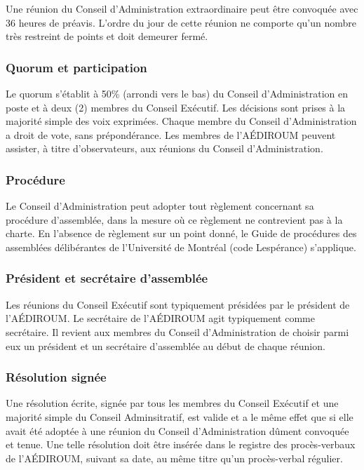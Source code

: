 \documentclass{aediroum}
\begin{document}
Une réunion du Conseil d'Administration extraordinaire peut être convoquée avec 36 heures de préavis. L'ordre du jour de cette réunion ne comporte qu'un nombre très restreint de points et doit demeurer fermé.

\subsubsection{Quorum et participation}\label{sec:quorum-et-participation}

Le quorum s'établit à 50\% (arrondi vers le bas) du Conseil d'Administration en poste et à deux (2) membres du Conseil Exécutif. Les décisions sont prises à la majorité simple des voix exprimées. Chaque membre du Conseil d'Administration a droit de vote, sans prépondérance. Les membres de l'AÉDIROUM peuvent assister, à titre d'observateurs, aux réunions du Conseil d'Administration.

\subsubsection{Procédure}\label{sec:procedure-admin}

Le Conseil d'Administration peut adopter tout règlement concernant sa procédure d'assemblée, dans la mesure où ce règlement ne contrevient pas à la charte. En l'absence de règlement sur un point donné, le Guide de procédures des assemblées délibérantes de l'Université de Montréal (code Lespérance) s'applique.

\subsubsection{Président et secrétaire d'assemblée}\label{sec:president-et-secretaire-dassemblee}

Les réunions du Conseil Exécutif sont typiquement présidées par le président de l'AÉDIROUM. Le secrétaire de l'AÉDIROUM agit typiquement comme secrétaire. Il revient aux membres du Conseil d'Administration de choisir parmi eux un président et un secrétaire d'assemblée au début de chaque réunion.

\subsubsection{Résolution signée}\label{sec:resolution-signee}

Une résolution écrite, signée par tous les membres du Conseil Exécutif et une majorité simple du Conseil Adminsitratif, est valide et a le même effet que si elle avait été adoptée à une réunion du Conseil d'Administration dûment convoquée et tenue. Une telle résolution doit être insérée dans le registre des procès-verbaux de l'AÉDIROUM, suivant sa date, au même titre qu'un procès-verbal régulier.
\end{document}

